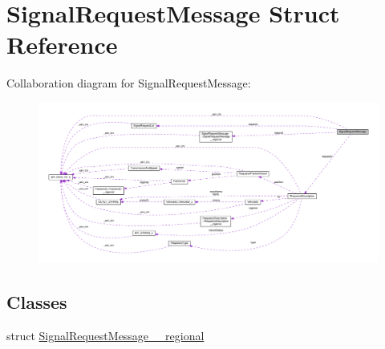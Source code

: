 \hypertarget{structSignalRequestMessage}{}\section{Signal\+Request\+Message Struct Reference}
\label{structSignalRequestMessage}


Collaboration diagram for Signal\+Request\+Message\+:\nopagebreak
\begin{figure}[H]
\begin{center}
\leavevmode
\includegraphics[width=350pt]{structSignalRequestMessage__coll__graph}
\end{center}
\end{figure}
\subsection*{Classes}
\begin{DoxyCompactItemize}
\item 
struct \hyperlink{structSignalRequestMessage_1_1SignalRequestMessage____regional}{Signal\+Request\+Message\+\_\+\+\_\+regional}
\end{DoxyCompactItemize}
